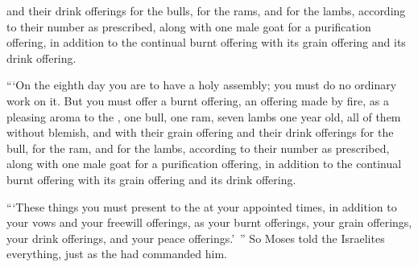 {and their drink offerings
for the bulls,
for the rams,
and for the lambs,
according to their number
as prescribed,
along with one
male goat
for a purification
offering, in addition
to the continual
burnt offering
with its grain offering
and its drink offering.
\par }{\PP {}“‘On
the eighth
day
you are to have a holy assembly;
you must do
no
ordinary
work on it.
But you must offer
a burnt offering,
an offering made by fire,
as a pleasing
aroma
to the
{}, one bull,
one
ram,
seven
lambs
one
year
old, all of them without blemish,
and with their grain offering
and their drink offerings
for the bull,
for the ram,
and for the lambs,
according to their number
as prescribed,
along with one
male goat
for a purification
offering, in addition
to the continual
burnt offering
with its grain offering
and its drink offering.
\par }{\PP {}“‘These
things you must present
to the
{}
at your appointed
times, in addition
to your vows
and your freewill
offerings, as your burnt offerings,
your grain offerings,
your drink offerings,
and your peace offerings.’ ”
So Moses
told
the Israelites
everything,
just as
the {}
had commanded
him.

}
